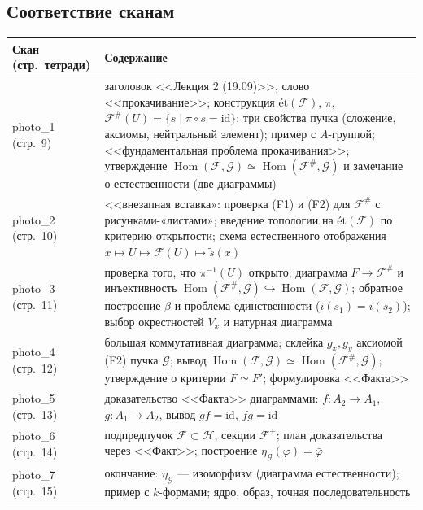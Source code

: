 \documentclass[11pt,b5paper]{article}
\newcommand{\et}{\text{ét}}
\newcommand{\Hom}{\operatorname{Hom}}
\newcommand{\id}{\mathrm{id}}
\newcommand{\Shv}[1]{\mathscr{#1}}   %
\theoremstyle{plain}
\theoremstyle{definition}
\theoremstyle{remark}
\let\brutsubsection\subsection
\renewcommand{\subsection}{\Needspace{5\baselineskip}\brutsubsection}
\begin{document}
\subsection{Соответствие сканам}
\leavevmode\par
\begin{center}\small
\renewcommand{\arraystretch}{1.25}
\begin{tabular}{@{}p{}p{}@{}}
\toprule
Скан (стр.\ тетради) & Содержание \\
\midrule
photo\_1 (стр.~9) &
 заголовок <<Лекция 2 (19.09)>>, слово <<прокачивание>>;
 конструкция $\et(\Shv{F})$, $\pi$, $\Shv{F}^{\#}(U)=\{s\mid\pi\circ s=\id\}$;
 три свойства пучка (сложение, аксиомы, нейтральный элемент);
 пример с $A$-группой; <<фундаментальная проблема прокачивания>>;
 утверждение $\Hom(\Shv{F},\Shv{G})\simeq\Hom(\Shv{F}^{\#},\Shv{G})$
 и замечание о естественности (две диаграммы) \\
photo\_2 (стр.~10) &
 <<внезапная вставка»: проверка (F1) и (F2) для $\Shv{F}^{\#}$
 с рисунками-«листами»; введение топологии на $\et(\Shv{F})$ по
 критерию открытости; схема естественного отображения
 $x\mapsto U\mapsto\Shv{F}(U)\mapsto\tilde s(x)$ \\
photo\_3 (стр.~11) &
 проверка того, что $\pi^{-1}(U)$ открыто; диаграмма
 $F\to\Shv{F}^{\#}$ и инъективность $\Hom(\Shv{F}^{\#},\Shv{G})
 \hookrightarrow\Hom(\Shv{F},\Shv{G})$; обратное построение $\beta$
 и проблема единственности ($i(s_1)=i(s_2)$); выбор окрестностей
 $V_x$ и натурная диаграмма \\
photo\_4 (стр.~12) &
 большая коммутативная диаграмма; склейка $g_x,g_y$ аксиомой (F2)
 пучка $\Shv{G}$; вывод $\Hom(\Shv{F},\Shv{G})\simeq\Hom(\Shv{F}^{\#},
 \Shv{G})$; утверждение о критерии $F\simeq F'$; формулировка <<Факта>> \\
photo\_5 (стр.~13) &
 доказательство <<Факта>> диаграммами: $f\colon A_2\to A_1$,
 $g\colon A_1\to A_2$, вывод $gf=\id$, $fg=\id$ \\
photo\_6 (стр.~14) &
 подпредпучок $\Shv{F}\subset\Shv{H}$, секции $\Shv{F}^{+}$;
 план доказательства через <<Факт>>; построение
 $\eta_{\Shv{G}}(\varphi)=\bar\varphi$ \\
photo\_7 (стр.~15) &
 окончание: $\eta_{\Shv{G}}$ --- изоморфизм (диаграмма
 естественности); пример с $k$-формами; ядро, образ,
 точная последовательность \\
\bottomrule
\end{tabular}
\end{center}
\end{document}
